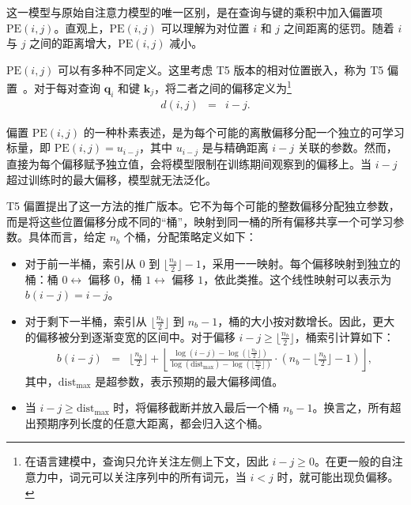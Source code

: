\noindent 这一模型与原始自注意力模型的唯一区别，是在查询与键的乘积中加入偏置项 $\mathrm{PE}(i,j)$。直观上，$\mathrm{PE}(i,j)$ 可以理解为对位置 $i$ 和 $j$ 之间距离的惩罚。随着 $i$ 与 $j$ 之间的距离增大，$\mathrm{PE}(i,j)$ 减小。

$\mathrm{PE}(i,j)$ 可以有多种不同定义。这里考虑 T5 版本的相对位置嵌入，称为 T5 偏置~\cite{raffel-etal:2020exploring}。对于每对查询 $\mathbf{q}_i$ 和键 $\mathbf{k}_j$，将二者之间的偏移定义为\footnote{在语言建模中，查询只允许关注左侧上下文，因此 $i - j \ge 0$。在更一般的自注意力中，词元可以关注序列中的所有词元，当 $i < j$ 时，就可能出现负偏移。
}
\begin{eqnarray}
d(i,j) & = & i - j.
\end{eqnarray}

偏置 $\mathrm{PE}(i,j)$ 的一种朴素表述，是为每个可能的离散偏移分配一个独立的可学习标量，即 $\mathrm{PE}(i,j) = u_{i-j}$，其中 $u_{i-j}$ 是与精确距离 $i - j$ 关联的参数。然而，直接为每个偏移赋予独立值，会将模型限制在训练期间观察到的偏移上。当 $i-j$ 超过训练时的最大偏移，模型就无法泛化。

T5 偏置提出了这一方法的推广版本。它不为每个可能的整数偏移分配独立参数，而是将这些位置偏移分成不同的“桶”，映射到同一桶的所有偏移共享一个可学习参数。具体而言，给定 $n_b$ 个桶，分配策略定义如下：

\begin{itemize}
\item \vspace{0.5em} 对于前一半桶，索引从 $0$ 到 $\lfloor \frac{n_b}{2} \rfloor - 1$，采用一一映射。每个偏移映射到独立的桶：桶 $0 \leftrightarrow$ 偏移 $0$，桶 $1 \leftrightarrow$ 偏移 $1$，依此类推。这个线性映射可以表示为 $b(i - j) = i - j$。
\item \vspace{0.3em} 对于剩下一半桶，索引从 $\lfloor \frac{n_b}{2} \rfloor$ 到 $n_b - 1$，桶的大小按对数增长。因此，更大的偏移被分到逐渐变宽的区间中。对于偏移 $i - j \ge \lfloor \frac{n_b}{2} \rfloor$，桶索引计算如下：
    \begin{eqnarray}
    b(i - j) & = & \lfloor \frac{n_b}{2} \rfloor + \left\lfloor \frac{\log(i - j) - \log(\lfloor \frac{n_b}{2} \rfloor)}{\log(\mathrm{dist}_{\mathrm{max}}) - \log(\lfloor \frac{n_b}{2} \rfloor)} \cdot \left(n_b - \lfloor \frac{n_b}{2} \rfloor - 1\right) \right\rfloor,
    \end{eqnarray}
    \noindent 其中，$\mathrm{dist}_{\mathrm{max}}$ 是超参数，表示预期的最大偏移阈值。
\item \vspace{0.3em} 当 $i - j \ge \mathrm{dist}_{\mathrm{max}}$ 时，将偏移截断并放入最后一个桶 $n_b - 1$。换言之，所有超出预期序列长度的任意大距离，都会归入这个桶。
\end{itemize}


